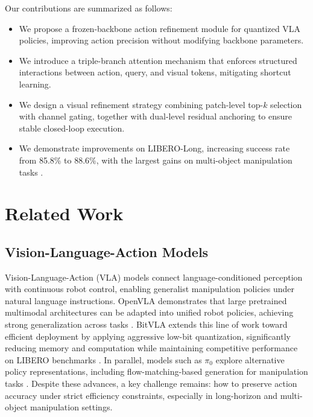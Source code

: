\documentclass[conference]{IEEEtran}
\begin{document}
Our contributions are summarized as follows:
\begin{itemize}
    \item We propose a frozen-backbone action refinement module for quantized VLA policies, improving action precision without modifying backbone parameters.
    \item We introduce a triple-branch attention mechanism that enforces structured interactions between action, query, and visual tokens, mitigating shortcut learning.
    \item We design a visual refinement strategy combining patch-level top-$k$ selection with channel gating, together with dual-level residual anchoring to ensure stable closed-loop execution.
    \item We demonstrate improvements on LIBERO-Long, increasing success rate from 85.8\% to 88.6\%, with the largest gains on multi-object manipulation tasks \cite{liu2023libero}.
\end{itemize}

\section{Related Work}

\subsection{Vision-Language-Action Models}
Vision-Language-Action (VLA) models connect language-conditioned perception with continuous robot control, enabling generalist manipulation policies under natural language instructions. OpenVLA demonstrates that large pretrained multimodal architectures can be adapted into unified robot policies, achieving strong generalization across tasks \cite{kim2024openvla}. BitVLA extends this line of work toward efficient deployment by applying aggressive low-bit quantization, significantly reducing memory and computation while maintaining competitive performance on LIBERO benchmarks \cite{wang2025bitvla}. In parallel, models such as $\pi_0$ explore alternative policy representations, including flow-matching-based generation for manipulation tasks \cite{black2024pi0}. 
Despite these advances, a key challenge remains: how to preserve action accuracy under strict efficiency constraints, especially in long-horizon and multi-object manipulation settings.
\end{document}
